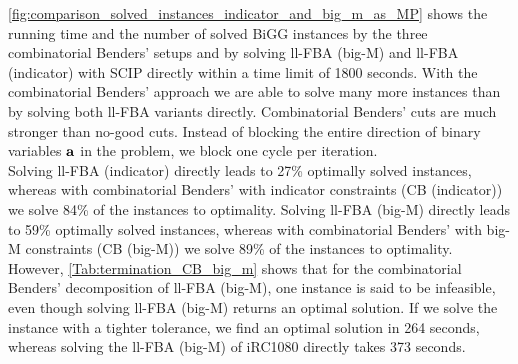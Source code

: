 \cref{fig:comparison_solved_instances_indicator_and_big_m_as_MP} shows the running time and the number of solved BiGG instances by the three combinatorial Benders' setups and by solving \textsf{ll-FBA (big-M)} and \textsf{ll-FBA (indicator)} with \textsf{SCIP} directly within a time limit of 1800 seconds. 
With the combinatorial Benders' approach we are able to solve many more instances than by solving both ll-FBA variants directly. Combinatorial Benders' cuts are much stronger than no-good cuts. Instead of blocking the entire direction of binary variables $\bold a$ in the problem, we block one cycle per iteration. \\
Solving \textsf{ll-FBA (indicator)} directly leads to 27\% optimally solved instances, whereas with combinatorial Benders' with indicator constraints (\textsf{CB (indicator)}) we solve 84\% of the instances to optimality. Solving \textsf{ll-FBA (big-M)} directly leads to 59\% optimally solved instances, whereas with combinatorial Benders' with big-M constraints (\textsf{CB (big-M)}) we solve 89\% of the instances to optimality. %
However, \cref{Tab:termination_CB_big_m} shows that for the combinatorial Benders' decomposition of \textsf{ll-FBA (big-M)}, one instance is said to be infeasible, even though solving \textsf{ll-FBA (big-M)} returns an optimal solution. If we solve the instance with a tighter tolerance, we find an optimal solution in 264 seconds, whereas solving the \textsf{ll-FBA (big-M)} of \textsf{iRC1080} directly takes 373 seconds.

